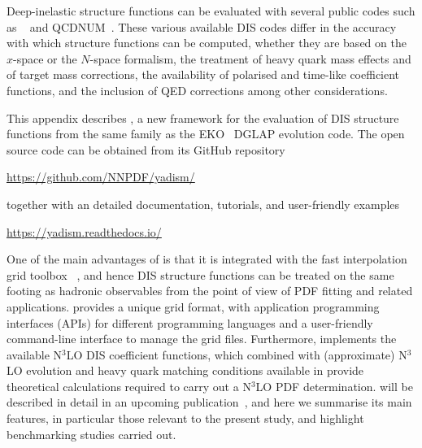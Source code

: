 
Deep-inelastic structure functions can be evaluated with several public codes
such as \apfel~\cite{Bertone:2013vaa} and \textsc{\small
QCDNUM}~\cite{Botje:2010ay}.
%
These various available DIS codes differ in the accuracy with which structure
functions can be computed, whether they are based on the $x$-space or the
$N$-space formalism, the treatment of heavy quark mass effects and of target
mass corrections, the availability of polarised and time-like coefficient
functions, and the inclusion of QED corrections among  other considerations.

This appendix describes \yadism, a new framework for the evaluation of DIS
structure functions from the same family as the \textsc{\small
EKO}~\cite{Candido:2022tld} DGLAP evolution code.
%
The open source \yadism code can be obtained from its GitHub repository
\begin{center}
  \url{https://github.com/NNPDF/yadism/}
\end{center}  
together with an detailed documentation, tutorials, and user-friendly examples
\begin{center}
  \url{https://yadism.readthedocs.io/}
\end{center}  
One of the main advantages of \yadism is that it is integrated with the fast
interpolation grid toolbox \pineappl~\cite{Carrazza:2020gss},
and hence DIS structure functions can be treated on the same footing as
hadronic observables from the point of view of PDF fitting and related
applications.
%
\pineappl provides a unique grid format, with application
programming interfaces (APIs) for different programming languages and a
user-friendly command-line interface to manage the grid files.
%
Furthermore, \yadism implements the available N$^3$LO DIS coefficient
functions, which combined with (approximate)  N$^3$LO evolution and heavy quark
matching conditions available in \eko provide theoretical
calculations required to carry out a N$^3$LO PDF determination.
%
\yadism will be described in detail in an upcoming publication~\cite{yadism},
and here we summarise its main features, in particular those relevant to the
present study, and highlight benchmarking studies carried out.

